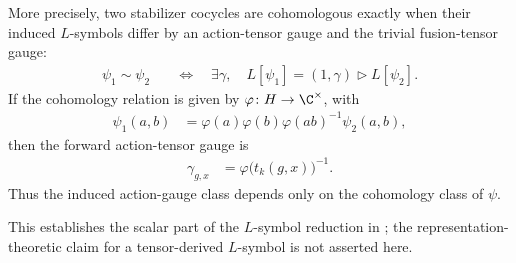 \begin{lemma}
    More precisely, two stabilizer cocycles are cohomologous exactly when
    their induced $L$-symbols differ by an action-tensor gauge and the trivial
    fusion-tensor gauge:
    \begin{align}
        \psi_1\sim\psi_2
         & \quad\Longleftrightarrow\quad
        \exists\gamma,\quad
        L[\psi_1]=(1,\gamma)\mathbin{\triangleright}L[\psi_2].
        \label{eq:mpug_induced_cohomology_iff}
    \end{align}
    If the cohomology relation is given by
    $\varphi\colon H\to\C^\times$, with
    \begin{align}
        \psi_1(a,b)
         & =\varphi(a)\varphi(b)\varphi(ab)^{-1}\psi_2(a,b),
        \label{eq:mpug_stabilizer_cocycle_gauge}
    \end{align}
    then the forward action-tensor gauge is
    \begin{align}
        \gamma_{g,x} & =\varphi\bigl(t_k(g,x)\bigr)^{-1}.
        \label{eq:mpug_induced_action_gauge}
    \end{align}
    Thus the induced action-gauge class depends only on the cohomology class
    of $\psi$.

    This establishes the scalar part of the $L$-symbol reduction in
    \cite[lines~7028--7042]{FrancoRubio2025MPUGauging}; the
    representation-theoretic claim for a tensor-derived $L$-symbol is not
    asserted here.
\end{lemma}


